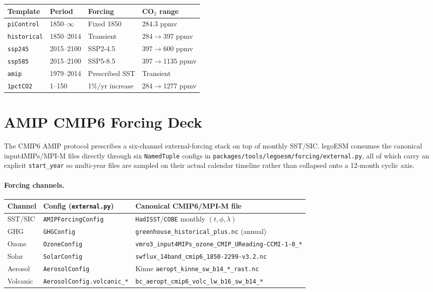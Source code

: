 \documentclass[11pt,twoside]{report}
\begin{document}
\begin{center}
\begin{tabular}{llll}
\toprule
Template & Period & Forcing & CO$_2$ range \\
\midrule
\texttt{piControl} & 1850--$\infty$ & Fixed 1850 & 284.3 ppmv \\
\texttt{historical} & 1850--2014 & Transient & 284$\to$397 ppmv \\
\texttt{ssp245} & 2015--2100 & SSP2-4.5 & 397$\to$600 ppmv \\
\texttt{ssp585} & 2015--2100 & SSP5-8.5 & 397$\to$1135 ppmv \\
\texttt{amip} & 1979--2014 & Prescribed SST & Transient \\
\texttt{1pctCO2} & 1--150 & 1\%/yr increase & 284$\to$1277 ppmv \\
\bottomrule
\end{tabular}
\end{center}

\section{AMIP CMIP6 Forcing Deck}
\label{sec:amip-cmip6-deck}

The CMIP6 AMIP protocol prescribes a six-channel external-forcing stack
on top of monthly SST/SIC.  legoESM consumes the canonical
input4MIPs/MPI-M files directly through six \texttt{NamedTuple} configs in
\texttt{packages/tools/legoesm/}\allowbreak\texttt{forcing/external.py}, all of which carry an explicit
\texttt{start\_year} so multi-year files are sampled on their actual
calendar timeline rather than collapsed onto a 12-month cyclic axis.

\paragraph{Forcing channels.}
\begin{center}
\begin{tabular}{lll}
\toprule
Channel & Config (\texttt{external.py}) & Canonical CMIP6/MPI-M file \\
\midrule
SST/SIC          & \texttt{AMIPForcingConfig}   & \texttt{HadISST}/\texttt{COBE} monthly $(t,\phi,\lambda)$ \\
GHG              & \texttt{GHGConfig}            & \texttt{greenhouse\_historical\_plus.nc} (annual) \\
Ozone            & \texttt{OzoneConfig}          & \texttt{vmro3\_input4MIPs\_ozone\_CMIP\_UReading-CCMI-1-0\_*} \\
Solar            & \texttt{SolarConfig}          & \texttt{swflux\_14band\_cmip6\_1850-2299-v3.2.nc} \\
Aerosol          & \texttt{AerosolConfig}        & Kinne \texttt{aeropt\_kinne\_sw\_b14\_*\_rast.nc} \\
Volcanic         & \texttt{AerosolConfig.volcanic\_*} & \texttt{bc\_aeropt\_cmip6\_volc\_lw\_b16\_sw\_b14\_*} \\
\bottomrule
\end{tabular}
\end{center}
\end{document}

